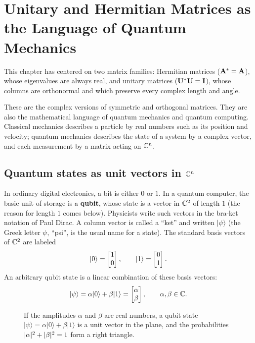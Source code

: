 \providecommand{\ket}[1]{\lvert #1 \rangle}
\providecommand{\bra}[1]{\langle #1 \rvert}
\providecommand{\braket}[2]{\langle #1 \mid #2 \rangle}

\section{Unitary and Hermitian Matrices as the Language of Quantum Mechanics}
\label{ch32:quantum-bridge}

This chapter has centered on two matrix families:
Hermitian matrices ($\mathbf{A}^* = \mathbf{A}$), whose eigenvalues are always real,
and unitary matrices ($\mathbf{U}^*\mathbf{U} = \mathbf{I}$), whose columns are orthonormal
and which preserve every complex length and angle.

These are the complex versions of symmetric and orthogonal matrices. They are also
the mathematical language of quantum mechanics and quantum computing. Classical
mechanics describes a particle by real numbers such as its position and velocity;
quantum mechanics describes the state of a system by a complex vector, and each
measurement by a matrix acting on $\mathbb{C}^n$.

\subsection{Quantum states as unit vectors in $\mathbb{C}^n$}

In ordinary digital electronics, a bit is either $0$ or $1$. In a quantum
computer, the basic unit of storage is a \textbf{qubit}, whose state is a vector
in $\mathbb{C}^2$ of length $1$ (the reason for length $1$ comes below). Physicists write
such vectors in the bra-ket notation of Paul Dirac. A column vector is called a
``ket'' and written $\ket{\psi}$ (the Greek letter $\psi$, ``psi'', is the usual
name for a state).
The standard basis vectors of $\mathbb{C}^2$ are labeled
\[
  \ket{0} = \colvec{1\\0}, \qquad \ket{1} = \colvec{0\\1}.
\]
An arbitrary qubit state is a linear combination of these basis vectors:
\[
  \ket{\psi} = \alpha\ket{0} + \beta\ket{1} = \colvec{\alpha \\ \beta},
  \qquad \alpha,\beta \in \C.
\]

\begin{figure}[htbp]
\centering
{}
\caption{If the amplitudes $\alpha$ and $\beta$ are real numbers, a qubit state $\ket{\psi} = \alpha\ket{0} + \beta\ket{1}$ is a unit vector in the plane, and the probabilities $\lvert\alpha\rvert^2 + \lvert\beta\rvert^2 = 1$ form a right triangle.}
\label{ch32:qubit-real}
\end{figure}


